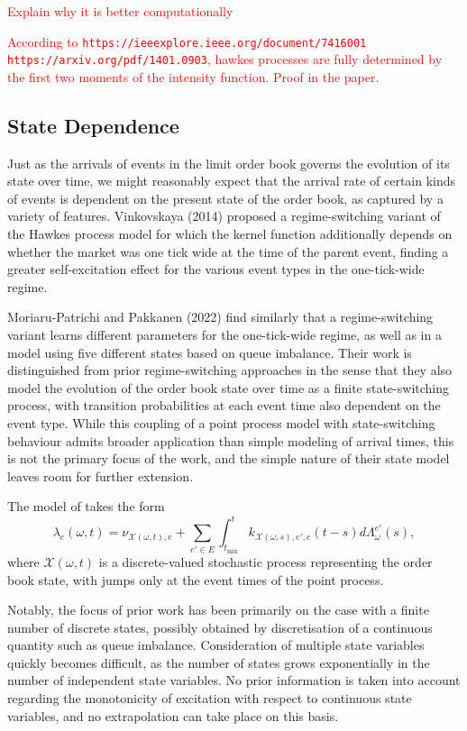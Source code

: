 \documentclass[honours,12pt]{unswthesis}
\numberwithin{equation}{section}
\begin{document}
\textcolor{red}{Explain why it is better computationally}

\textcolor{red}{According to \texttt{https://ieeexplore.ieee.org/document/7416001 https://arxiv.org/pdf/1401.0903}, hawkes processes are fully determined by the first two moments of the intensity function. Proof in the paper.}

\subsection{State Dependence}
Just as the arrivals of events in the limit order book governs the evolution of its state over time, we might reasonably expect that the arrival rate of certain kinds of events is dependent on the present state of the order book, as captured by a variety of features. Vinkovskaya (2014) \cite{Vinkovskaya} proposed a regime-switching variant of the Hawkes process model for which the kernel function additionally depends on whether the market was one tick wide at the time of the parent event, finding a greater self-excitation effect for the various event types in the one-tick-wide regime.

Moriaru-Patrichi and Pakkanen (2022) \cite{MoriaruPatrichiPakkanen} find similarly that a regime-switching variant learns different parameters for the one-tick-wide regime, as well as in a model using five different states based on queue imbalance. Their work is distinguished from prior regime-switching approaches in the sense that they also model the evolution of the order book state over time as a finite state-switching process, with transition probabilities at each event time also dependent on the event type. While this coupling of a point process model with state-switching behaviour admits broader application than simple modeling of arrival times, this is not the primary focus of the work, and the simple nature of their state model leaves room for further extension.

The model of \cite{MoriaruPatrichiPakkanen} takes the form
\begin{equation}
	\lambda_e(\omega,t) = \nu_{\mathcal{X}(\omega,t),e} + \sum_{e'\in E}\int_{t_\mathrm{min}}^t k_{\mathcal{X}(\omega,s),e',e}(t-s)d\Lambda_\omega^{e'}(s), \label{eq:sdhp}
\end{equation}
where $\mathcal{X}(\omega,t)$ is a discrete-valued stochastic process representing the order book state, with jumps only at the event times of the point process.

Notably, the focus of prior work has been primarily on the case with a finite number of discrete states, possibly obtained by discretisation of a continuous quantity such as queue imbalance. Consideration of multiple state variables quickly becomes difficult, as the number of states grows exponentially in the number of independent state variables. No prior information is taken into account regarding the monotonicity of excitation with respect to continuous state variables, and no extrapolation can take place on this basis.
\end{document}
